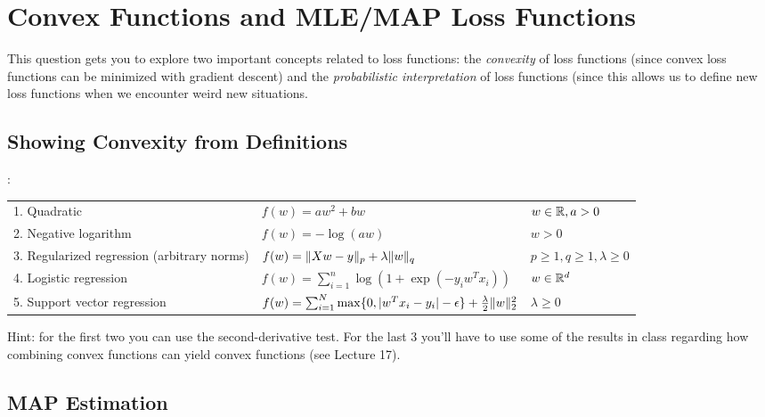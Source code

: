 \documentclass{article}
\begin{document}
\section{Convex Functions and MLE/MAP Loss Functions}

This question gets you to explore two important concepts related to loss functions: the \emph{convexity} of loss functions (since convex loss functions can be minimized with gradient descent) and the \emph{probabilistic interpretation} of loss functions (since this allows us to define new loss functions when we encounter weird new situations.


\subsection{Showing Convexity from Definitions}

:
\begin{center}
\begin{tabular}{lll}
1. Quadratic & $f(w) = aw^2 + bw$ & $w \in \mathbb{R}, a > 0$ \\
2. Negative logarithm & $f(w) = -\log(aw) $ & $w > 0$\\
3. Regularized regression (arbitrary norms) &  $f(w) = \|Xw - y\|_p + \lambda\|w\|_q$ & $p \geq 1, q \geq 1, \lambda \geq 0$\\
4. Logistic regression & $f(w) = \sum_{i=1}^n \log(1+\exp(-y_iw^Tx_i)) $& $w \in \mathbb{R}^d$\\
5. Support vector regression & $f(w) = \sum_{i=1}^N\max\{0, |w^Tx_i - y_i| - \epsilon\} + \frac{\lambda}{2}\|w\|_2^2$ & $\lambda \geq 0$\\
\end{tabular}
\end{center}

Hint: for the first two you can use the second-derivative test. For the last 3 you'll have to use some of the results in class regarding how combining convex functions  can yield convex functions (see Lecture 17).

\subsection{MAP Estimation}
\end{document}
